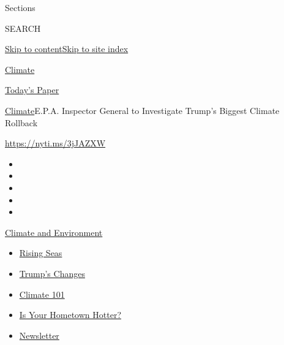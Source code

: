 Sections

SEARCH

\protect\hyperlink{site-content}{Skip to
content}\protect\hyperlink{site-index}{Skip to site index}

\href{https://www.nytimes3xbfgragh.onion/section/climate}{Climate}

\href{https://myaccount.nytimes3xbfgragh.onion/auth/login?response_type=cookie\&client_id=vi}{}

\href{https://www.nytimes3xbfgragh.onion/section/todayspaper}{Today's
Paper}

\href{/section/climate}{Climate}\textbar{}E.P.A. Inspector General to
Investigate Trump's Biggest Climate Rollback

\url{https://nyti.ms/3jJAZXW}

\begin{itemize}
\item
\item
\item
\item
\item
\end{itemize}

\href{https://www.nytimes3xbfgragh.onion/section/climate?action=click\&pgtype=Article\&state=default\&region=TOP_BANNER\&context=storylines_menu}{Climate
and Environment}

\begin{itemize}
\tightlist
\item
  \href{https://www.nytimes3xbfgragh.onion/2020/07/30/climate/sea-level-inland-floods.html?action=click\&pgtype=Article\&state=default\&region=TOP_BANNER\&context=storylines_menu}{Rising
  Seas}
\item
  \href{https://www.nytimes3xbfgragh.onion/interactive/2020/climate/trump-environment-rollbacks.html?action=click\&pgtype=Article\&state=default\&region=TOP_BANNER\&context=storylines_menu}{Trump's
  Changes}
\item
  \href{https://www.nytimes3xbfgragh.onion/interactive/2020/04/19/climate/climate-crash-course-1.html?action=click\&pgtype=Article\&state=default\&region=TOP_BANNER\&context=storylines_menu}{Climate
  101}
\item
  \href{https://www.nytimes3xbfgragh.onion/interactive/2018/08/30/climate/how-much-hotter-is-your-hometown.html?action=click\&pgtype=Article\&state=default\&region=TOP_BANNER\&context=storylines_menu}{Is
  Your Hometown Hotter?}
\item
  \href{https://www.nytimes3xbfgragh.onion/newsletters/climate-change?action=click\&pgtype=Article\&state=default\&region=TOP_BANNER\&context=storylines_menu}{Newsletter}
\end{itemize}

